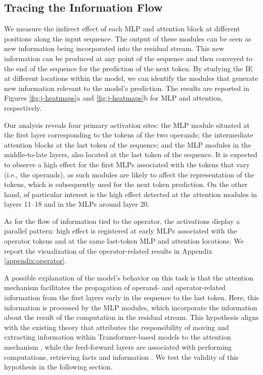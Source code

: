 \documentclass[11pt]{article}
\begin{document}
\subsection{Tracing the Information Flow}
\label{sec:int1}
We measure the indirect effect of each MLP and attention block at different positions along the input sequence. The output of these modules can be seen as new information being incorporated into the residual stream. This new information can be produced at any point of the sequence and then conveyed to the end of the sequence for the prediction of the next token.
By studying the IE at different locations within the model, we can identify the modules that generate new information relevant to the model's prediction.
The results are reported in Figures \ref{fig:j-heatmaps}a and \ref{fig:j-heatmaps}b for MLP and attention, respectively.

Our analysis reveals four primary activation sites:
the MLP module situated at the first layer corresponding to the tokens of the two operands; the intermediate attention blocks at the last token of the sequence; and the MLP modules in the middle-to-late layers, also located at the last token of the sequence.
It is expected to observe a high effect for the first MLPs associated with the tokens that vary (i.e., the operands), as such modules are likely to affect the representation of the tokens, which is subsequently used for the next token prediction.
On the other hand, of particular interest is the high effect detected at the attention modules in layers 11--18 and in the MLPs around layer 20.

As for the flow of information tied to the operator, the activations display a parallel pattern: high effect is registered at early MLPs associated with the operator tokens and at the same last-token MLP and attention locations. We report the visualization of the operator-related results in Appendix \ref{appendix:operator}.

A possible explanation of the model's behavior on this task is that the attention mechanism facilitates the propagation of operand- and operator-related information from the first layers early in the sequence to the last token. Here, this information is processed by the MLP modules, which incorporate the information about the result of the computation in the residual stream.
This hypothesis aligns with the existing theory that attributes the responsibility of moving and extracting information within Transformer-based models to the attention mechanism \cite{elhage2021mathematical, geva2023dissecting}, while the feed-forward layers are associated with performing computations, retrieving facts and information \cite{geva-etal-2022-transformer, din2023jump, meng2022locating}.
We test the validity of this hypothesis in the following section.
\end{document}
